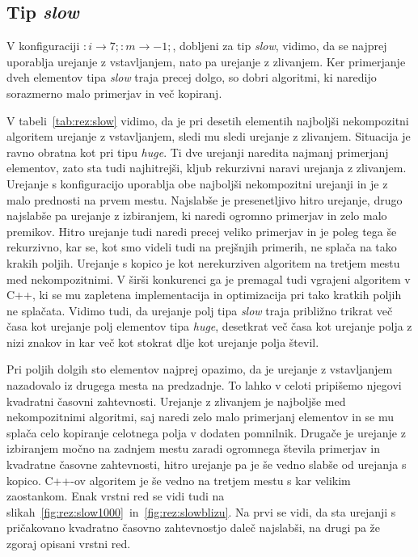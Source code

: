 \documentclass[a4paper,oneside,12pt]{article}
\newcommand{\lra}{\ensuremath{\longrightarrow}}
\begin{document}
\subsection{Tip \emph{slow}}
V konfiguraciji
$:i \lra 7;:m \lra -1;$, dobljeni za tip \emph{slow}, 
vidimo, da se najprej uporablja urejanje z vstavljanjem, nato pa
urejanje z zlivanjem. Ker primerjanje dveh elementov tipa \emph{slow} traja precej dolgo, so dobri algoritmi, ki
naredijo sorazmerno malo primerjav in več kopiranj. 

V tabeli~\ref{tab:rez:slow} vidimo, da je pri desetih elementih najboljši nekompozitni algoritem urejanje z
vstavljanjem, sledi mu sledi urejanje z zlivanjem. Situacija je ravno
obratna kot pri tipu \emph{huge}. Ti dve urejanji naredita najmanj primerjanj
elementov, zato sta tudi najhitrejši, kljub rekurzivni naravi urejanja z
zlivanjem. Urejanje s konfiguracijo uporablja obe
najboljši nekompozitni urejanji in je z malo prednosti na prvem mestu. Najslabše
je presenetljivo hitro urejanje, drugo najslabše pa urejanje z izbiranjem, ki
naredi ogromno primerjav in zelo malo premikov. Hitro urejanje tudi naredi
precej veliko primerjav in je poleg tega še rekurzivno, kar se, kot smo videli tudi
na prejšnjih primerih, ne splača na tako krakih poljih. Urejanje s kopico je kot
nerekurziven algoritem na tretjem mestu med nekompozitnimi. V širši
konkurenci ga je premagal tudi vgrajeni algoritem v C++, ki se mu zapletena
implementacija in optimizacija pri tako kratkih poljih ne splačata.
Vidimo tudi, da urejanje polj tipa \emph{slow} traja približno trikrat več časa kot
urejanje polj elementov tipa \emph{huge}, desetkrat več časa kot urejanje polja
z nizi znakov in kar več kot stokrat dlje kot urejanje polja števil.

Pri poljih dolgih sto elementov najprej opazimo, da je urejanje z vstavljanjem
nazadovalo iz drugega mesta na predzadnje. To lahko v celoti pripišemo njegovi
kvadratni časovni zahtevnosti. Urejanje z zlivanjem je najboljše med
nekompozitnimi algoritmi, saj naredi zelo malo primerjanj elementov in se mu
splača celo kopiranje celotnega polja v dodaten pomnilnik. Drugače je urejanje z
izbiranjem močno na zadnjem mestu zaradi ogromnega števila primerjav in
kvadratne časovne zahtevnosti, hitro urejanje pa je še vedno slabše od urejanja s
kopico. C++-ov algoritem je še vedno na tretjem mestu s kar velikim zaostankom.
Enak vrstni red se vidi tudi na
slikah~\ref{fig:rez:slow1000}~in~\ref{fig:rez:slowblizu}. Na prvi se vidi, da
sta urejanji s pričakovano kvadratno časovno zahtevnostjo daleč najslabši, na
drugi pa že zgoraj opisani vrstni red.
\end{document}
